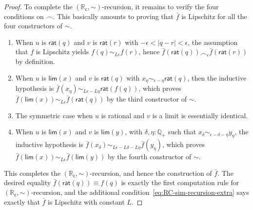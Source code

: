 \documentclass[10pt,a4paper]{article}
\newcommand{\jdeq}{\equiv}      %
\newcommand{\Q}{\ensuremath{\mathbb{Q}}\xspace}
\newcommand{\RC}{\ensuremath{\mathbb{R}_\mathsf{c}}\xspace} %
\newcommand{\close}[1]{\sim_{#1}} %
\newcommand{\closesym}{\mathord\sim}
\newcommand{\rclim}{\mathsf{lim}} %
\newcommand{\rcrat}{\mathsf{rat}} %
\newcommand{\Qp}{\Q_{+}}
\newcommand{\bsim}{\frown}
\theoremstyle{definition}
\theoremstyle{remark}
\numberwithin{equation}{section}
\newcommand{\narrowequation}[1]{$#1$}
\begin{document}
\begin{proof}
  To complete the $(\RC,\closesym)$-recursion, it remains to verify the four conditions on $\bsim$.
  This basically amounts to proving that $\bar f$ is Lipschitz for all the four constructors of $\closesym$.
  \begin{enumerate}
  \item When $u$ is $\rcrat(q)$ and $v$ is $\rcrat(r)$ with $-\epsilon < |q-r| <\epsilon$, the assumption that $f$ is Lipschitz yields $f(q) \close{L\epsilon} f(r)$, hence $\bar{f}(\rcrat(q)) \bsim_\epsilon \bar{f}(\rcrat(r))$ by definition.
  \item When $u$ is $\rclim(x)$ and $v$ is $\rcrat(q)$ with $x_\eta \close{\epsilon - \eta} \rcrat(q)$, then the
      inductive hypothesis is $\bar{f}(x_\eta) \close{L \epsilon - L \eta} \rcrat(f(q))$, which proves
      \narrowequation{\bar{f}(\rclim(x)) \close{L \epsilon} \bar{f}(\rcrat(q))}
      by the third constructor of $\closesym$.
  \item The symmetric case when $u$ is rational and $v$ is a limit is essentially identical.
  \item When $u$ is $\rclim(x)$ and $v$ is $\rclim(y)$, with $\delta, \eta : \Qp$ such that $x_\delta \close{\epsilon - \delta - \eta} y_\eta$,
      the inductive hypothesis is $\bar{f}(x_\delta) \close{L \epsilon - L \delta - L \eta} \bar{f}(y_\eta)$, which proves $\bar{f}(\rclim(x)) \close{L
        \epsilon} \bar{f}(\rclim(y))$ by the fourth constructor of $\closesym$.
  \end{enumerate}
  This completes the $(\RC,\closesym)$-recursion, and hence the construction of $\bar f$.
  The desired equality $\bar f(\rcrat(q))\jdeq f(q)$ is exactly the first computation rule for $(\RC,\closesym)$-recursion, and the additional condition~\eqref{eq:RC-sim-recursion-extra} says exactly that $\bar f$ is Lipschitz with constant $L$.
\end{proof}
\end{document}

